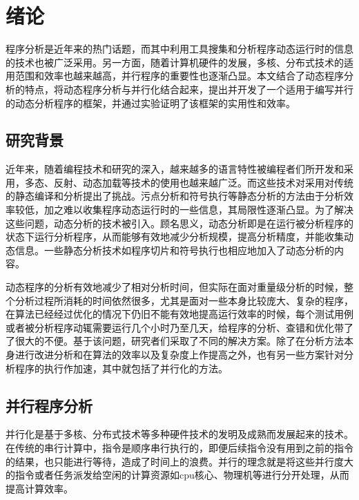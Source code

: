 
\chapter{绪论}
\label{chap:Intorduction}

程序分析是近年来的热门话题，而其中利用工具搜集和分析程序动态运行时的信息的技术也被广泛采用。另一方面，随着计算机硬件的发展，多核、分布式技术的适用范围和效率也越来越高，并行程序的重要性也逐渐凸显。本文结合了动态程序分析的特点，将动态程序分析与并行化结合起来，提出并开发了一个适用于编写并行的动态分析程序的框架，并通过实验证明了该框架的实用性和效率。

\section{研究背景}

近年来，随着编程技术和研究的深入，越来越多的语言特性被编程者们所开发和采用，多态、反射、动态加载等技术的使用也越来越广泛。而这些技术对采用对传统的静态编译和分析提出了挑战。污点分析\cite{taint01,taint02}和符号执行\cite{symbExec}等静态分析的方法由于分析效率较低，加之难以收集程序动态运行时的一些信息，其局限性逐渐凸显。为了解决这些问题，动态分析的技术被引入。顾名思义，动态分析即是在运行被分析程序的状态下运行分析程序，从而能够有效地减少分析规模，提高分析精度，并能收集动态信息。一些静态分析技术如程序切片\cite{dynSlc}和符号执行\cite{dynSym}也相应地加入了动态分析的内容。

动态程序的分析有效地减少了相对分析时间，但实际在面对重量级分析的时候，整个分析过程所消耗的时间依然很多，尤其是面对一些本身比较庞大、复杂的程序，在算法已经经过优化的情况下仍旧不能有效地提高运行效率的时候，每个测试用例或者被分析程序动辄需要运行几个小时乃至几天，给程序的分析、查错和优化带了了很大的不便。基于该问题，研究者们采取了不同的解决方案。除了在分析方法本身进行改进分析和在算法的效率以及复杂度上作提高之外，也有另一些方案针对分析程序的执行作加速，其中就包括了并行化的方法。

\section{并行程序分析}

并行化是基于多核、分布式技术等多种硬件技术的发明及成熟而发展起来的技术。在传统的串行计算中，指令是顺序串行执行的，即便后续指令没有用到之前的指令的结果，也只能进行等待，造成了时间上的浪费。并行的理念就是将这些并行度大的指令或者任务派发给空闲的计算资源如cpu核心、物理机等进行分开处理，从而提高计算效率。

